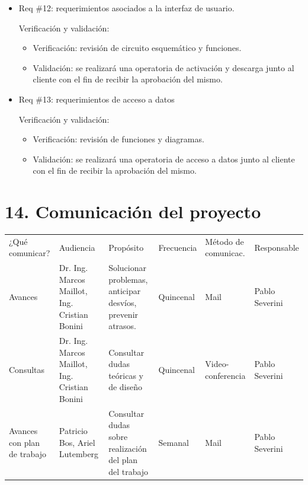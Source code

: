 \documentclass[11pt]{charter}
\begin{document}
\begin{itemize}
\item Req \#12: requerimientos asociados a la interfaz de usuario.

Verificación y validación:

\begin{itemize}
\item Verificación: revisión de circuito esquemático y funciones.
\item Validación: se realizará una operatoria de activación y descarga junto al cliente con el fin de recibir la aprobación del mismo.
\end{itemize}

\item Req \#13: requerimientos de acceso a datos

Verificación y validación:

\begin{itemize}
\item Verificación: revisión de funciones y diagramas.
\item Validación: se realizará una operatoria de acceso a datos junto al cliente con el fin de recibir la aprobación del mismo. 
\end{itemize}

\end{itemize}


\section{14. Comunicación del proyecto}
\label{sec:comunicaciones}

\begin{table}[H]
\centering
\begin{tabularx}{\linewidth}{@{}|X|X|X|X|X|X|@{}}
\hline
\rowcolor[HTML]{C0C0C0} 
\multicolumn{6}{|c|}{\cellcolor[HTML]{C0C0C0}PLAN DE COMUNICACIÓN DEL PROYECTO}           \\ \hline
\rowcolor[HTML]{C0C0C0} 
¿Qué comunicar? & Audiencia & Propósito & Frecuencia & Método de comunicac. & Responsable \\ \hline
Avances         & \raggedright Dr. Ing. Marcos Maillot, Ing. Cristian Bonini & Solucionar problemas, anticipar desvíos, prevenir atrasos.          & Quincenal  & Mail			        & \raggedright\arraybackslash Pablo Severini            \\ \hline
Consultas       & \raggedright Dr. Ing. Marcos Maillot, Ing. Cristian Bonini & Consultar dudas teóricas y de diseño  
& Quincenal  	& Video-conferencia     & \raggedright\arraybackslash Pablo Severini            \\ \hline
Avances con plan de trabajo         & \raggedright Patricio Bos, Ariel Lutemberg  & Consultar dudas sobre realización del plan del trabajo     &  Semanal          & Mail          & \raggedright\arraybackslash Pablo Severini            \\ \hline
 \end{tabularx}
\end{table}
\pagebreak
\end{document}
